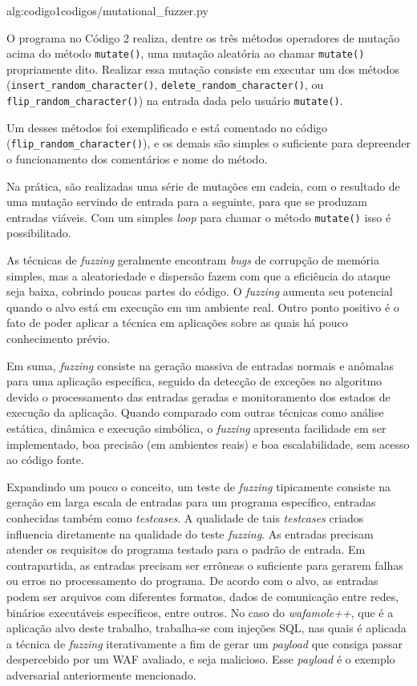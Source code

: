  {alg:codigo1}{codigos/mutational_fuzzer.py}

\bigskip
O programa no Código 2 realiza, dentre os três métodos operadores de mutação acima do método \verb+mutate()+, uma mutação aleatória ao chamar \verb+mutate()+ propriamente dito. Realizar essa mutação consiste em executar um dos métodos (\verb+insert_random_character()+, \verb+delete_random_character()+, ou \verb+flip_random_character()+)  na entrada dada pelo usuário  \verb+mutate()+. 

Um desses métodos foi exemplificado e está comentado no código \linebreak (\verb+flip_random_character()+), e os demais são simples o suficiente para depreender o funcionamento dos comentários e nome do método.

Na prática, são realizadas uma série de mutações em cadeia, com o resultado de uma mutação servindo de entrada para a seguinte, para que se produzam entradas viáveis. Com um simples \textit{loop} para chamar o método \verb+mutate()+ isso é possibilitado.

As técnicas de \textit{fuzzing} geralmente encontram \textit{bugs} de corrupção de memória simples, mas a aleatoriedade e dispersão fazem com que a eficiência do ataque seja baixa, cobrindo poucas partes do código. O \textit{fuzzing} aumenta seu potencial quando o alvo está em execução em um ambiente real. Outro ponto positivo é o fato de poder aplicar a técnica em aplicações sobre as quais há pouco conhecimento prévio.

Em suma, \textit{fuzzing} consiste na geração massiva de entradas normais e anômalas para uma aplicação específica, seguido da detecção de exceções no algoritmo devido o processamento das entradas geradas e monitoramento dos estados de execução da aplicação. Quando comparado com outras técnicas como análise estática, dinâmica e execução simbólica, o \textit{fuzzing} apresenta facilidade em ser implementado, boa precisão (em ambientes reais) e boa escalabilidade, sem acesso ao código fonte.

Expandindo um pouco o conceito, um teste de \textit{fuzzing} tipicamente consiste na geração em larga escala de entradas para um programa específico, entradas conhecidas também como \textit{testcases}. A qualidade de tais \textit{testcases} criados influencia diretamente na qualidade do teste \textit{fuzzing}. As entradas precisam atender os requisitos do programa testado para o padrão de entrada. Em contrapartida, as entradas precisam ser errôneas o suficiente para gerarem falhas ou erros no processamento do programa. De acordo com o alvo, as entradas podem ser arquivos com diferentes formatos, dados de comunicação entre redes, binários executáveis específicos, entre outros. No caso do \textit{wafamole++}, que é a aplicação alvo deste trabalho, trabalha-se com injeções SQL, nas quais é aplicada a técnica de \textit{fuzzing} iterativamente a fim de gerar um \textit{payload} que consiga passar despercebido por um WAF avaliado, e seja malicioso. Esse \textit{payload} é o exemplo adversarial anteriormente mencionado.

